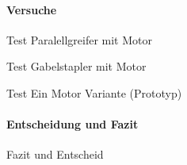 \documentclass[main.tex]{subfiles} %
\begin{document}
\paragraph{Versuche}

Test Paralellgreifer mit Motor

Test Gabelstapler mit Motor

Test Ein Motor Variante (Prototyp)

\paragraph{Entscheidung und Fazit}
Fazit und Entscheid
\end{document}
